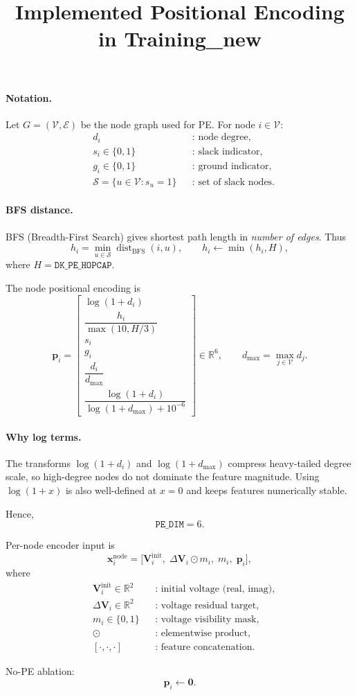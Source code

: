 \documentclass[11pt]{article}
\title{Implemented Positional Encoding in Training\_new}
\author{}
\date{}
\begin{document}
\maketitle

\paragraph{Notation.}
Let $G=(\mathcal{V},\mathcal{E})$ be the node graph used for PE.
For node $i\in\mathcal{V}$:
\[
\begin{aligned}
&d_i &&\text{: node degree},\\
&s_i\in\{0,1\} &&\text{: slack indicator},\\
&g_i\in\{0,1\} &&\text{: ground indicator},\\
&\mathcal{S}=\{u\in\mathcal{V}: s_u=1\} &&\text{: set of slack nodes.}
\end{aligned}
\]

\paragraph{BFS distance.}
BFS (Breadth-First Search) gives shortest path length in \emph{number of edges}.
Thus
\[
h_i = \min_{u\in\mathcal{S}} \operatorname{dist}_{\mathrm{BFS}}(i,u),
\qquad
h_i \leftarrow \min(h_i, H),
\]
where $H=\texttt{DK\_PE\_HOPCAP}$.

The node positional encoding is
\[
\bm{p}_i =
\begin{bmatrix}
\log(1+d_i) \\
\dfrac{h_i}{\max(10, H/3)} \\
s_i \\
g_i \\
\dfrac{d_i}{d_{\max}} \\
\dfrac{\log(1+d_i)}{\log(1+d_{\max})+10^{-6}}
\end{bmatrix}
\in \mathbb{R}^{6},
\qquad
d_{\max}=\max_{j\in\mathcal{V}} d_j.
\]

\paragraph{Why log terms.}
The transforms $\log(1+d_i)$ and $\log(1+d_{\max})$ compress heavy-tailed degree scale,
so high-degree nodes do not dominate the feature magnitude. Using $\log(1+x)$ is also
well-defined at $x=0$ and keeps features numerically stable.

Hence,
\[
\texttt{PE\_DIM}=6.
\]

Per-node encoder input is
\[
\bm{x}^{\mathrm{node}}_i
=
\big[\bm{V}^{\mathrm{init}}_i,\; \Delta\bm{V}_i\odot m_i,\; m_i,\; \bm{p}_i\big],
\]
where
\[
\begin{aligned}
&\bm{V}^{\mathrm{init}}_i\in\mathbb{R}^2 &&\text{: initial voltage (real, imag)},\\
&\Delta\bm{V}_i\in\mathbb{R}^2 &&\text{: voltage residual target},\\
&m_i\in\{0,1\} &&\text{: voltage visibility mask},\\
&\odot &&\text{: elementwise product},\\
&[\cdot,\cdot,\cdot] &&\text{: feature concatenation.}
\end{aligned}
\]

No-PE ablation:
\[
\bm{p}_i \leftarrow \bm{0}.
\]
\end{document}
